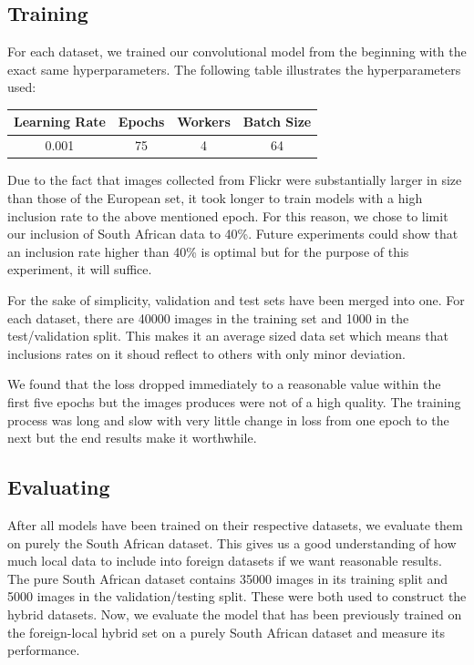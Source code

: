 \documentclass[conference]{IEEEtran}
\begin{document}
\subsection{Training}

For each dataset, we trained our convolutional model from the beginning with the exact same hyperparameters. The following table illustrates the hyperparameters used:


\begin{table}[h]
\centering
\begin{tabular}{|c|c|c|c|}
\hline 
Learning Rate & Epochs & Workers & Batch Size \\ 
\hline 
0.001 & 75 & 4 & 64 \\ 
\hline 
\end{tabular} 
\end{table}

Due to the fact that images collected from Flickr were substantially larger in size than those of the European set, it took longer to train models with a high inclusion rate to the above mentioned epoch. For this reason, we chose to limit our inclusion of South African data to 40\%. Future experiments could show that an inclusion rate higher than 40\% is optimal but for the purpose of this experiment, it will suffice.

For the sake of simplicity, validation and test sets have been merged into one. For each dataset, there are 40000 images in the training set and 1000 in the test/validation split. This makes it an average sized data set which means that inclusions rates on it shoud reflect to others with only minor deviation.

We found that the loss dropped immediately to a reasonable value within the first five epochs but the images produces were not of a high quality. The training process was long and slow with very little change in loss from one epoch to the next but the end results make it worthwhile.


\subsection{Evaluating}

After all models have been trained on their respective datasets, we evaluate them on purely the South African dataset. This gives us a good understanding of how much local data to include into foreign datasets if we want reasonable results. The pure South African dataset contains 35000 images in its training split and 5000 images in the validation/testing split. These were both used to construct the hybrid datasets. Now, we evaluate the model that has been previously trained on the foreign-local hybrid set on a purely South African dataset and measure its performance.
\end{document}
